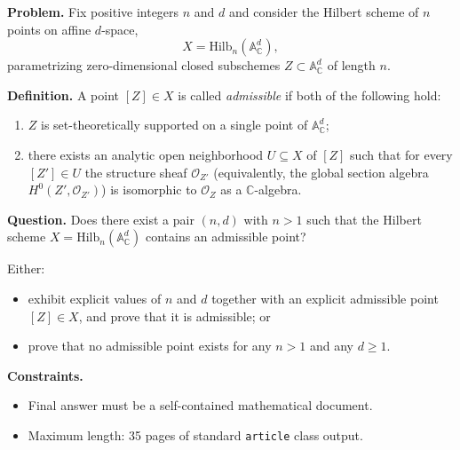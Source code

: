 \textbf{Problem.} Fix positive integers $n$ and $d$ and consider the
Hilbert scheme of $n$ points on affine $d$-space,
\[
  X = \mathrm{Hilb}_n(\mathbb{A}^d_{\mathbb{C}}),
\]
parametrizing zero-dimensional closed subschemes
$Z \subset \mathbb{A}^d_{\mathbb{C}}$ of length $n$.

\medskip

\noindent\textbf{Definition.} A point $[Z] \in X$ is called
\emph{admissible} if both of the following hold:
\begin{enumerate}
  \item $Z$ is set-theoretically supported on a single point of
        $\mathbb{A}^d_{\mathbb{C}}$;
  \item there exists an analytic open neighborhood $U \subseteq X$ of
        $[Z]$ such that for every $[Z'] \in U$ the structure sheaf
        $\mathcal{O}_{Z'}$ (equivalently, the global section algebra
        $H^0(Z', \mathcal{O}_{Z'})$) is isomorphic to $\mathcal{O}_Z$
        as a $\mathbb{C}$-algebra.
\end{enumerate}

\medskip

\noindent\textbf{Question.} Does there exist a pair $(n, d)$ with
$n > 1$ such that the Hilbert scheme
$X = \mathrm{Hilb}_n(\mathbb{A}^d_{\mathbb{C}})$ contains an admissible
point?

\smallskip

Either:
\begin{itemize}
  \item exhibit explicit values of $n$ and $d$ together with an
        explicit admissible point $[Z] \in X$, and prove that it is
        admissible; or
  \item prove that no admissible point exists for any $n > 1$ and any
        $d \ge 1$.
\end{itemize}

\bigskip

\noindent\textbf{Constraints.}
\begin{itemize}
  \item Final answer must be a self-contained mathematical document.
  \item Maximum length: 35 pages of standard \texttt{article} class
        output.
\end{itemize}
